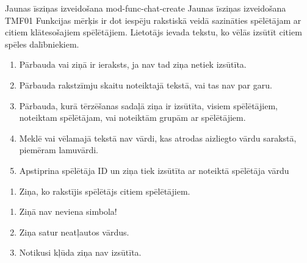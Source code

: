 \moduleFunctionTable
{Jaunas īsziņas izveidošana}
{mod-func-chat-create}
{Jaunas īsziņas izveidošana}
{TMF01}
{
	Funkcijas mērķis ir dot iespēju rakstiskā veidā sazināties spēlētājam ar citiem klātesošajiem spēlētājiem.
}
{
	Lietotājs ievada tekstu, ko vēlās izsūtīt citiem spēles dalībniekiem.
}
{
	\begin{enumerate}
		\item Pārbauda vai ziņā ir ieraksts, ja nav tad ziņa netiek izsūtīta.
		\item Pārbauda rakstzīmju skaitu noteiktajā tekstā, vai tas nav par garu.
		\item Pārbauda, kurā tērzēšanas sadaļā ziņa ir izsūtīta, visiem spēlētājiem, noteiktam spēlētājam, vai noteiktām grupām ar spēlētājiem.
		\item Meklē vai vēlamajā tekstā nav vārdi, kas atrodas aizliegto vārdu sarakstā, piemēram lamuvārdi.
		\item Apstiprina spēlētāja ID un ziņa tiek izsūtīta ar noteiktā spēlētāja vārdu
	\end{enumerate}
}
{
	\begin{enumerate}
		\item Ziņa, ko rakstījis spēlētājs citiem spēlētājiem.
	\end{enumerate}
}
{
	\begin{enumerate}
		\item Ziņā nav neviena simbola!
		\item Ziņa satur neatļautos vārdus.
		\item Notikusi kļūda ziņa nav izsūtīta.
	\end{enumerate}
}
